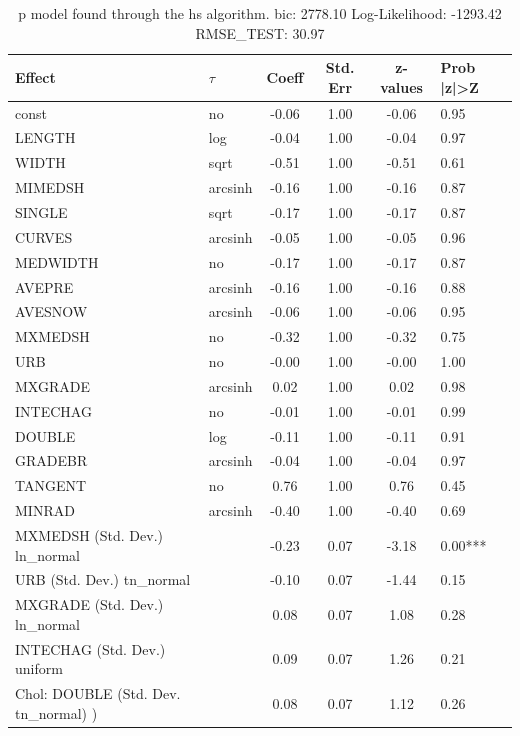 \begin{table}
	\caption{p model found through the hs algorithm. bic: 2778.10 Log-Likelihood: -1293.42 RMSE_TEST: 30.97}
	\begin{center}
		\begin{tabular}{|l|l|c|c|c|l|}
			\hline
			Effect & $\tau$ & Coeff & Std. Err & z-values & Prob |z|>Z \\
			\hline
			const & no & -0.06 & 1.00 & -0.06 & 0.95 \\
			\hline
			LENGTH & log & -0.04 & 1.00 & -0.04 & 0.97 \\
			\hline
			WIDTH & sqrt & -0.51 & 1.00 & -0.51 & 0.61 \\
			\hline
			MIMEDSH & arcsinh & -0.16 & 1.00 & -0.16 & 0.87 \\
			\hline
			SINGLE & sqrt & -0.17 & 1.00 & -0.17 & 0.87 \\
			\hline
			CURVES & arcsinh & -0.05 & 1.00 & -0.05 & 0.96 \\
			\hline
			MEDWIDTH & no & -0.17 & 1.00 & -0.17 & 0.87 \\
			\hline
			AVEPRE & arcsinh & -0.16 & 1.00 & -0.16 & 0.88 \\
			\hline
			AVESNOW & arcsinh & -0.06 & 1.00 & -0.06 & 0.95 \\
			\hline
			MXMEDSH & no & -0.32 & 1.00 & -0.32 & 0.75 \\
			\hline
			URB & no & -0.00 & 1.00 & -0.00 & 1.00 \\
			\hline
			MXGRADE & arcsinh & 0.02 & 1.00 & 0.02 & 0.98 \\
			\hline
			INTECHAG & no & -0.01 & 1.00 & -0.01 & 0.99 \\
			\hline
			DOUBLE & log & -0.11 & 1.00 & -0.11 & 0.91 \\
			\hline
			GRADEBR & arcsinh & -0.04 & 1.00 & -0.04 & 0.97 \\
			\hline
			TANGENT & no & 0.76 & 1.00 & 0.76 & 0.45 \\
			\hline
			MINRAD & arcsinh & -0.40 & 1.00 & -0.40 & 0.69 \\
			\hline
			MXMEDSH (Std. Dev.) ln_normal &  & -0.23 & 0.07 & -3.18 & 0.00*** \\
			\hline
			URB (Std. Dev.) tn_normal &  & -0.10 & 0.07 & -1.44 & 0.15 \\
			\hline
			MXGRADE (Std. Dev.) ln_normal &  & 0.08 & 0.07 & 1.08 & 0.28 \\
			\hline
			INTECHAG (Std. Dev.) uniform &  & 0.09 & 0.07 & 1.26 & 0.21 \\
			\hline
			 Chol: DOUBLE (Std. Dev. tn_normal) ) &  & 0.08 & 0.07 & 1.12 & 0.26 \\

\end{tabular}
\end{center}
\end{table}
